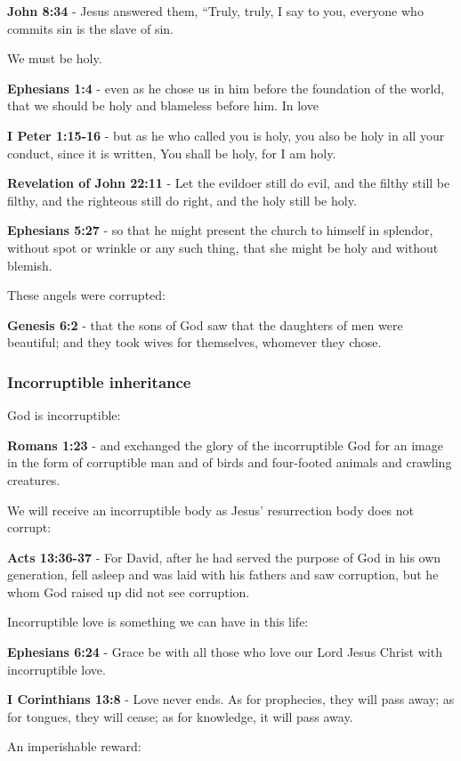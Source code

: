 \documentclass[11pt]{article}
\begin{document}
\textbf{John 8:34} - Jesus answered them, “Truly, truly, I say to you, everyone who commits sin is the slave of sin.

We must be holy.

\textbf{Ephesians 1:4} - even as he chose us in him before the foundation of the world, that we should be holy and blameless before him. In love

\textbf{I Peter 1:15-16} - but as he who called you is holy, you also be holy in all your conduct, since it is written, You shall be holy, for I am holy.

\textbf{Revelation of John 22:11} - Let the evildoer still do evil, and the filthy still be filthy, and the righteous still do right, and the holy still be holy.

\textbf{Ephesians 5:27} - so that he might present the church to himself in splendor, without spot or wrinkle or any such thing, that she might be holy and without blemish.

These angels were corrupted:

\textbf{Genesis 6:2} - that the sons of God saw that the daughters of men were beautiful; and they took wives for themselves, whomever they chose.

\subsubsection{Incorruptible inheritance}
\label{sec:orgafaa82b}
God is incorruptible:

\textbf{Romans 1:23} - and exchanged the glory of the incorruptible God for an image in the form of corruptible man and of birds and four-footed animals and crawling creatures.

We will receive an incorruptible body as Jesus' resurrection body does not corrupt:

\textbf{Acts 13:36-37} - For David, after he had served the purpose of God in his own generation, fell asleep and was laid with his fathers and saw corruption, but he whom God raised up did not see corruption.

Incorruptible love is something we can have in this life:

\textbf{Ephesians 6:24} - Grace be with all those who love our Lord Jesus Christ with incorruptible love.

\textbf{I Corinthians 13:8} - Love never ends. As for prophecies, they will pass away; as for tongues, they will cease; as for knowledge, it will pass away.

An imperishable reward:
\end{document}
